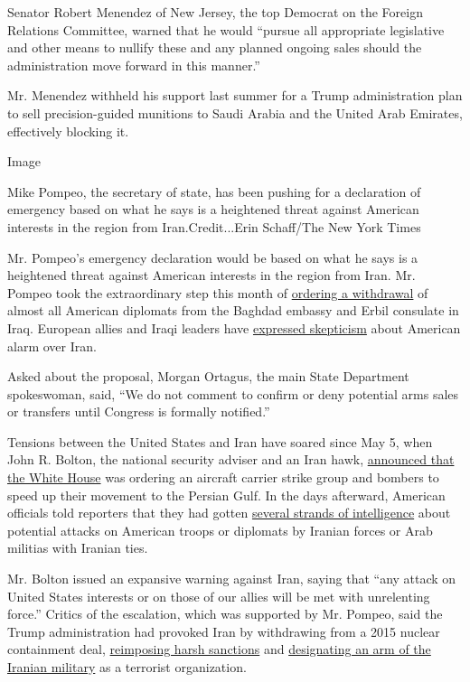 Senator Robert Menendez of New Jersey, the top Democrat on the Foreign
Relations Committee, warned that he would ``pursue all appropriate
legislative and other means to nullify these and any planned ongoing
sales should the administration move forward in this manner.''

Mr. Menendez withheld his support last summer for a Trump administration
plan to sell precision-guided munitions to Saudi Arabia and the United
Arab Emirates, effectively blocking it.

Image

Mike Pompeo, the secretary of state, has been pushing for a declaration
of emergency based on what he says is a heightened threat against
American interests in the region from Iran.Credit...Erin Schaff/The New
York Times

Mr. Pompeo's emergency declaration would be based on what he says is a
heightened threat against American interests in the region from Iran.
Mr. Pompeo took the extraordinary step this month of
\href{https://www.nytimes.com/2019/05/15/us/politics/us-iraq-embassy-evacuation.html}{ordering
a withdrawal} of almost all American diplomats from the Baghdad embassy
and Erbil consulate in Iraq. European allies and Iraqi leaders have
\href{https://www.nytimes.com/2019/05/14/world/middleeast/trump-iran-threats.html}{expressed
skepticism} about American alarm over Iran.

Asked about the proposal, Morgan Ortagus, the main State Department
spokeswoman, said, ``We do not comment to confirm or deny potential arms
sales or transfers until Congress is formally notified.''

Tensions between the United States and Iran have soared since May 5,
when John R. Bolton, the national security adviser and an Iran hawk,
\href{https://www.nytimes.com/2019/05/05/world/middleeast/us-iran-military-threat-.html}{announced
that the White House} was ordering an aircraft carrier strike group and
bombers to speed up their movement to the Persian Gulf. In the days
afterward, American officials told reporters that they had gotten
\href{https://www.nytimes.com/2019/05/15/world/middleeast/iran-war-usa.html}{several
strands of intelligence} about potential attacks on American troops or
diplomats by Iranian forces or Arab militias with Iranian ties.

Mr. Bolton issued an expansive warning against Iran, saying that ``any
attack on United States interests or on those of our allies will be met
with unrelenting force.'' Critics of the escalation, which was supported
by Mr. Pompeo, said the Trump administration had provoked Iran by
withdrawing from a 2015 nuclear containment deal,
\href{https://www.nytimes.com/2019/04/22/world/middleeast/us-iran-oil-sanctions-.html}{reimposing
harsh sanctions} and
\href{https://www.nytimes.com/2019/04/08/world/middleeast/trump-iran-revolutionary-guard-corps.html}{designating
an arm of the Iranian military} as a terrorist organization.

